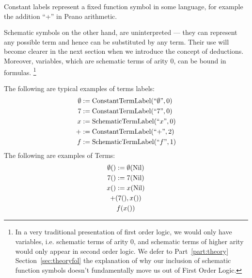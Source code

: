 Constant labels represent a fixed function symbol in some language, for example the addition ``+'' in Peano arithmetic.

Schematic symbols on the other hand, are uninterpreted --- they can represent any possible term and hence can be substituted by any term. Their use will become clearer in the next section when we introduce the concept of deductions.  Moreover, variables, which are schematic terms of arity 0, can be bound in formulas. \footnote{In a very traditional presentation of first order logic, we would only have variables, i.e. schematic terms of arity 0, and schematic terms of higher arity would only appear in second order logic. We defer to Part~\ref{part:theory} Section~\ref{sec:theoryfol} the explanation of why our inclusion of schematic function symbols doesn't fundamentally move us out of First Order Logic.}

\begin{example}[Terms]The following are typical examples of terms labels:
  \begin{align*}
    \emptyset & := \operatorname{ConstantTermLabel}(``\emptyset", 0) \\
    7         & := \operatorname{ConstantTermLabel}(``7", 0)         \\
    x         & := \operatorname{SchematicTermLabel}(``x", 0)        \\
    +         & := \operatorname{ConstantTermLabel}(``{+}", 2)       \\
    f         & := \operatorname{SchematicTermLabel}(``f", 1)        \\
  \end{align*}
  The following are examples of Terms:
  \begin{gather*}
    \emptyset() := \emptyset(\operatorname{Nil})\\
    7() := 7(\operatorname{Nil})\\
    x() := x(\operatorname{Nil})\\
    +(7(), x())\\
    f(x())
  \end{gather*}

\end{example}


